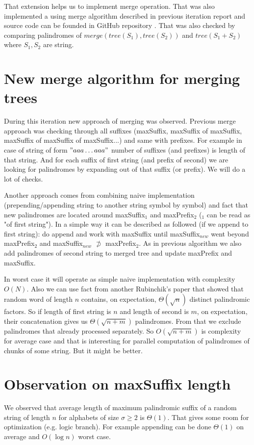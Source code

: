 That extension helps us to implement merge operation. That was also implemented a using merge algorithm described in previous iteration report and source code can be founded in GitHub repository \cite{khazhix3}. That was also checked by comparing palindromes of $merge(tree(S_1), tree(S_2))$ and $tree(S_1 + S_2)$ where $S_1, S_2$ are string.

\section{New merge algorithm for merging trees}
During this iteration new approach of merging was observed.
Previous merge approach was checking through all suffixes (maxSuffix, maxSuffix of maxSuffix, maxSuffix of maxSuffix of maxSuffix...) and same with prefixes. For example in case of string of form $"aaa\ldots aaa"$ number of suffixes (and prefixes) is length of that string. And for each suffix of first string (and prefix of second) we are looking for palindromes by expanding out of that suffix (or prefix). We will do a lot of checks.

Another approach comes from combining naive implementation (prepending/appending string to another string symbol by symbol) and fact that new palindromes are located around maxSuffix$_1$ and maxPrefix$_2$ ($_1$ can be read as "of first string"). In a simple way it can be described as followed (if we append to first string): do append and work with maxSuffix until maxSuffix$_{new}$ went beyond maxPrefix$_2$ and maxSuffix$_{new}$ $\not\supset$ maxPrefix$_2$.
As in previous algorithm we also add palindromes of second string to merged tree and update maxPrefix and maxSuffix.

In worst case it will operate as simple naive implementation with complexity $O(N)$. Also we can use fact from another Rubinchik's paper \cite{rubinchik2016number} that showed that random word of length $n$ contains, on expectation, $\Theta(\sqrt{n})$ distinct palindromic factors. So if length of first string is $n$ and length of second is $m$, on expectation, their concatenation gives us $\Theta(\sqrt{n + m})$ palindromes. From that we exclude palindromes that already processed separately. So $O(\sqrt{n + m})$ is complexity for average case and that is interesting for parallel computation of palindromes of chunks of some string. But it might be better.

\section{Observation on maxSuffix length}
We observed that average length of maximum palindromic suffix of a random string of length $n$ for alphabets of size $\sigma \geq 2$ is $\Theta(1)$. That gives some room for optimization (e.g. logic branch). For example appending can be done $\Theta(1)$ on average and $O(\log n)$ worst case.